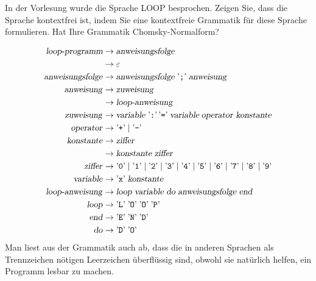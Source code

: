 In der Vorlesung wurde die Sprache LOOP besprochen. Zeigen Sie, dass
die Sprache kontextfrei ist, indem Sie eine
kontextfreie Grammatik für diese Sprache formulieren.
Hat Ihre Grammatik Chomsky-Normalform?


\begin{loesung}
\begin{align*}
\text{\textsl{loop-programm}}&\to\text{\textsl{anweisungsfolge}}\\
&\to\varepsilon\\
\text{\textsl{anweisungsfolge}}
&\to\text{\textsl{anweisungsfolge}}\;\text{'{\tt ;}'}\;
\text{\textsl{anweisung}}
\\
\text{\textsl{anweisung}}
&\to\text{\textsl{zuweisung}}
\\
&\to\text{\textsl{loop-anweisung}}
\\
\text{\textsl{zuweisung}}
&\to
\text{\textsl{variable}}\; \text{'{\tt :}'}\, \text{'{\tt =}'}\;
\textsl{variable}\;\text{\textsl{operator}}\;\text{\textsl{konstante}}
\\
\text{\textsl{operator}}
&\to\text{'{\tt +}'}\mid \text{'{\tt -}'}
\\
\text{\textsl{konstante}}&\to\text{\textsl{ziffer}}\\
&\to\text{\textsl{konstante}}\;\text{\textsl{ziffer}}
\\
\text{\textsl{ziffer}}&\to 
\text{'{\tt 0}'}\mid 
\text{'{\tt 1}'}\mid 
\text{'{\tt 2}'}\mid 
\text{'{\tt 3}'}\mid 
\text{'{\tt 4}'}\mid 
\text{'{\tt 5}'}\mid 
\text{'{\tt 6}'}\mid 
\text{'{\tt 7}'}\mid 
\text{'{\tt 8}'}\mid 
\text{'{\tt 9}'}\\
\text{\textsl{variable}}&\to \text{'{\tt x}'}\;\text{\textsl{konstante}}\\
\text{\textsl{loop-anweisung}}&\to
\text{\textsl{loop}}\;
\text{\textsl{variable}}\;
\text{\textsl{do}}\;
\text{\textsl{anweisungsfolge}}\;
\text{\textsl{end}}\\
\text{\textsl{loop}}&\to \text{'{\tt L}'}\; \text{'{\tt O}'}\; \text{'{\tt O}'}\; \text{'{\tt P}'}\\
\text{\textsl{end}}&\to \text{'{\tt E}'}\; \text{'{\tt N}'}\; \text{'{\tt D}'}\\
\text{\textsl{do}}&\to \text{'{\tt D}'}\; \text{'{\tt O}'} \\
\end{align*}
Man liest aus der Grammatik auch ab, dass die in anderen Sprachen als
Trennzeichen nötigen Leerzeichen überflüssig sind, obwohl sie natürlich
helfen, ein Programm lesbar zu machen.


\end{loesung}

